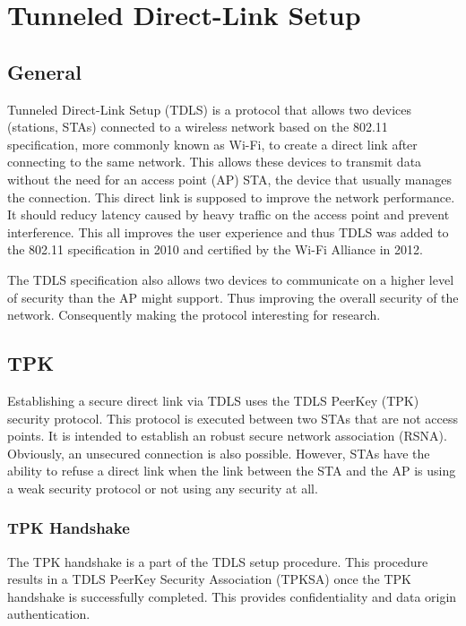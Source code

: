 \section{Tunneled Direct-Link Setup}\label{tdls}

\iffalse
- What is TDLS?
- Why TDLS?
- How does it work exactly?
\fi

\subsection{General}

Tunneled Direct-Link Setup (TDLS) is a protocol that allows two devices (stations, STAs) connected to a wireless network based on the 802.11 specification, more commonly known as Wi-Fi, to create a direct link after connecting to the same network. This allows these devices to transmit data without the need for an access point (AP) STA, the device that usually manages the connection\cite{tdlspress}. This direct link is supposed to improve the network performance. It should reducy latency caused by heavy traffic on the access point and prevent interference. This all improves the user experience and thus TDLS was added to the 802.11 specification in 2010 and certified by the Wi-Fi Alliance in 2012.

The TDLS specification also allows two devices to communicate on a higher level of security than the AP might support. Thus improving the overall security of the network. Consequently making the protocol interesting for research.

\subsection{TPK}

Establishing a secure direct link via TDLS uses the TDLS PeerKey (TPK) security protocol. This protocol is executed between two STAs that are not access points. It is intended to establish an robust secure network association (RSNA). Obviously, an unsecured connection is also possible. However, STAs have the ability to refuse a direct link when the link between the STA and the AP is using a weak security protocol or not using any security at all. 

\subsubsection{TPK Handshake}

The TPK handshake is a part of the TDLS setup procedure. This procedure results in a TDLS PeerKey Security Association (TPKSA) once the TPK handshake is successfully completed. This provides confidentiality and data origin authentication.

